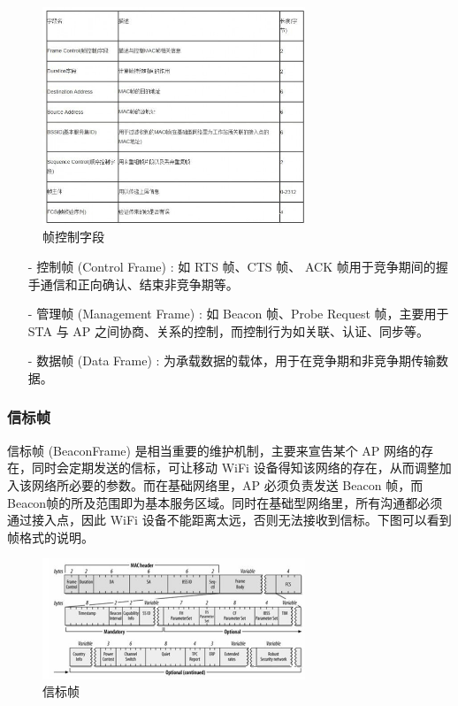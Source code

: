 \begin{figure}[htb]
\centering 
\includegraphics[width=0.70\textwidth]{img/ch1s5m2.jpg} 
\caption{帧控制字段}
\label{Test}
\end{figure}

\begin{itemize}
\item [-] 控制帧 (Control Frame) : 如 RTS 帧、CTS 帧、 ACK 帧用于竞争期间的握手通信和正向确认、结束非竞争期等。
\item [-] 管理帧 (Management Frame) : 如 Beacon 帧、Probe Request 帧，主要用于 STA 与 AP 之间协商、关系的控制，而控制行为如关联、认证、同步等。
\item [-] 数据帧 (Data Frame) : 为承载数据的载体，用于在竞争期和非竞争期传输数据。
\end{itemize}

\subsubsection{信标帧}

信标帧 (BeaconFrame) 是相当重要的维护机制，主要来宣告某个 AP 网络的存在，同时会定期发送的信标，可让移动 WiFi 设备得知该网络的存在，从而调整加入该网络所必要的参数。而在基础网络里，AP 必须负责发送 Beacon 帧，而 Beacon帧的所及范围即为基本服务区域。同时在基础型网络里，所有沟通都必须通过接入点，因此 WiFi 设备不能距离太远，否则无法接收到信标。下图可以看到帧格式的说明。

\begin{figure}[htb]
\centering 
\includegraphics[width=0.70\textwidth]{img/ch1s5m3.jpg} 
\caption{信标帧}
\label{Test}
\end{figure}


